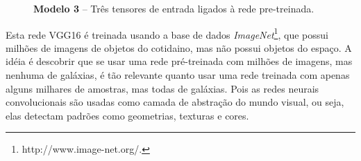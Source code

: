\begin{figure}[h!]
  \centering
  
  \caption{\textbf{Modelo 3} -- Três tensores de entrada ligados à rede pre-treinada.}
  \label{fig:splus_model}
\end{figure}

\pagebreak

Esta rede VGG16 é treinada usando a base de dados \emph{ImageNet}\footnote{http://www.image-net.org/.}, que possui milhões de imagens de objetos do cotidaino, mas não possui objetos do espaço. A idéia é descobrir que se usar uma rede pré-treinada com milhões de imagens, mas nenhuma de galáxias, é tão relevante quanto usar uma rede treinada com apenas alguns milhares de amostras, mas todas de galáxias. Pois as redes neurais convolucionais são usadas como camada de abstração do mundo visual, ou seja, elas detectam padrões como geometrias, texturas e cores.




